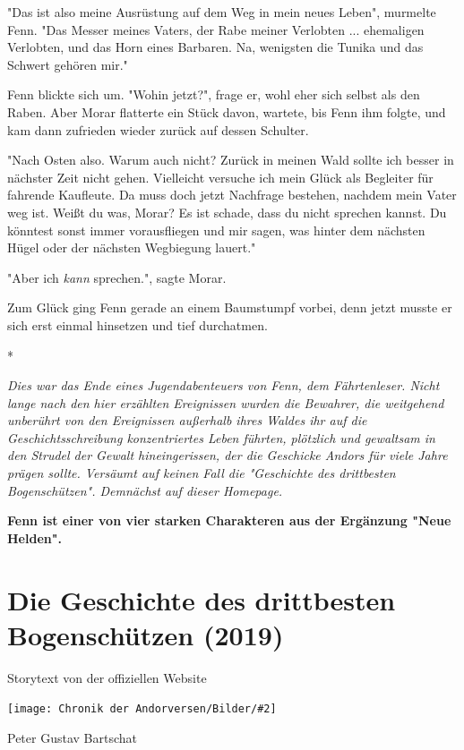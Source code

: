\documentclass[10pt, a4paper, oneside]{book}
\newcommand{\fillbreak}{\vspace*{\fill}\columnbreak}
\newcommand{\storytext}[1]{%
    \section{#1}%
    \label{Storytext: #1}%
}
\newcommand{\bildmitts}[2][height=0.32\textwidth,width=0.48\textwidth,keepaspectratio]{%
    \begin{center}
        \texttt{[image: Chronik der Andorversen/Bilder/\#2]}
    \end{center}
}
\begin{document}
\begin{multicols}{2}
"Das ist also meine Ausrüstung auf dem Weg in mein neues Leben", murmelte Fenn. "Das Messer meines Vaters, der Rabe meiner Verlobten ... ehemaligen Verlobten, und das Horn eines Barbaren. Na, wenigsten die Tunika und das Schwert gehören mir."

Fenn blickte sich um. "Wohin jetzt?", frage er, wohl eher sich selbst als den Raben. Aber Morar flatterte ein Stück davon, wartete, bis Fenn ihm folgte, und kam dann zufrieden wieder zurück auf dessen Schulter.

"Nach Osten also. Warum auch nicht? Zurück in meinen Wald sollte ich besser in nächster Zeit nicht gehen. Vielleicht versuche ich mein Glück als Begleiter für fahrende Kaufleute. Da muss doch jetzt Nachfrage bestehen, nachdem mein Vater weg ist. Weißt du was, Morar? Es ist schade, dass du nicht sprechen kannst. Du könntest sonst immer vorausfliegen und mir sagen, was hinter dem nächsten Hügel oder der nächsten Wegbiegung lauert."

"Aber ich \textit{kann} sprechen.", sagte Morar.

Zum Glück ging Fenn gerade an einem Baumstumpf vorbei, denn jetzt musste er sich erst einmal hinsetzen und tief durchatmen.

\begin{center}
    *
\end{center}

\textit{Dies war das Ende eines Jugendabenteuers von Fenn, dem Fährtenleser. Nicht lange nach den hier erzählten Ereignissen wurden die Bewahrer, die weitgehend unberührt von den Ereignissen außerhalb ihres Waldes ihr auf die Geschichtsschreibung konzentriertes Leben führten, plötzlich und gewaltsam in den Strudel der Gewalt hineingerissen, der die Geschicke Andors für viele Jahre prägen sollte. Versäumt auf keinen Fall die "Geschichte des drittbesten Bogenschützen". Demnächst auf dieser Homepage.}\bigskip

\textbf{Fenn ist einer von vier starken Charakteren aus der Ergänzung "Neue Helden". }



\fillbreak
\storytext{Die Geschichte des drittbesten Bogenschützen (2019)}

\begin{center}
    Storytext von der offiziellen Website
\end{center}

\bildmitts{Die Geschichte des drittbesten Bogenschützen Bild 1.jpg}

Peter Gustav Bartschat


\end{multicols}
\end{document}
